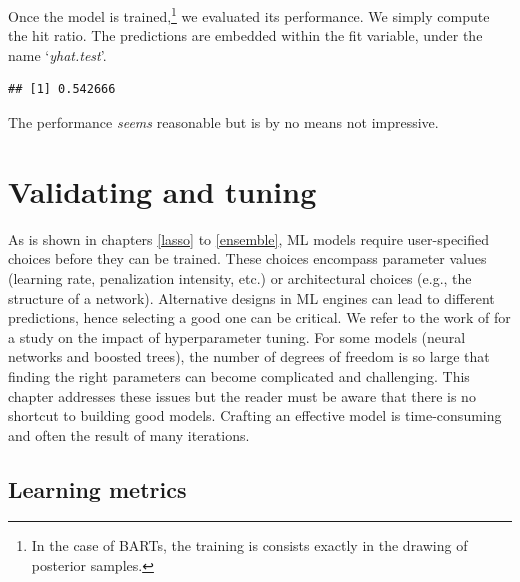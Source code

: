 \documentclass[]{krantz}
\makeatletter
\newenvironment{Shaded}{\begin{snugshade}}{\end{snugshade}}
\newcommand{\DecValTok}[1]{\textcolor[rgb]{0.06,0.06,0.06}{#1}}
\newcommand{\KeywordTok}[1]{\textcolor[rgb]{0.27,0.27,0.27}{\textbf{#1}}}
\newcommand{\NormalTok}[1]{#1}
\newcommand{\OperatorTok}[1]{\textcolor[rgb]{0.43,0.43,0.43}{\textbf{#1}}}
\newcommand{\StringTok}[1]{\textcolor[rgb]{0.5,0.5,0.5}{#1}}
\newenvironment{kframe}{%
\medskip{}
\setlength{\fboxsep}{.8em}
 \def\at@end@of@kframe{}%
 \ifinner\ifhmode%
  \def\at@end@of@kframe{\end{minipage}}%
  \begin{minipage}{\columnwidth}%
 \fi\fi%
 \def\FrameCommand##1{\hskip\@totalleftmargin \hskip-\fboxsep
 \colorbox{shadecolor}{##1}\hskip-\fboxsep
     \hskip-\linewidth \hskip-\@totalleftmargin \hskip\columnwidth}%
 \MakeFramed {\advance\hsize-\width
   \@totalleftmargin\z@ \linewidth\hsize
   \@setminipage}}%
 {\par\unskip\endMakeFramed%
 \at@end@of@kframe}
\renewenvironment{Shaded}{\begin{kframe}}{\end{kframe}}
\let\rmarkdownfootnote\footnote%
\def\footnote{\protect\rmarkdownfootnote}
\theoremstyle{definition}
\theoremstyle{definition}
\theoremstyle{definition}
\theoremstyle{remark}
\makeatother
\begin{document}
\normalsize

Once the model is trained,\footnote{In the case of BARTs, the training
  is consists exactly in the drawing of posterior samples.} we evaluated
its performance. We simply compute the hit ratio. The predictions are
embedded within the fit variable, under the name `\emph{yhat.test}'.

\footnotesize

\begin{Shaded}
\end{Shaded}

\begin{verbatim}
## [1] 0.542666
\end{verbatim}

\normalsize

The performance \emph{seems} reasonable but is by no means not
impressive.

\hypertarget{valtune}{%
\chapter{Validating and tuning}\label{valtune}}

As is shown in chapters \ref{lasso} to \ref{ensemble}, ML models require
user-specified choices before they can be trained. These choices
encompass parameter values (learning rate, penalization intensity, etc.)
or architectural choices (e.g., the structure of a network). Alternative
designs in ML engines can lead to different predictions, hence selecting
a good one can be critical. We refer to the work of
\citet{probst2018tunability} for a study on the impact of hyperparameter
tuning. For some models (neural networks and boosted trees), the number
of degrees of freedom is so large that finding the right parameters can
become complicated and challenging. This chapter addresses these issues
but the reader must be aware that there is no shortcut to building good
models. Crafting an effective model is time-consuming and often the
result of many iterations.

\hypertarget{mlmetrics}{%
\section{Learning metrics}\label{mlmetrics}}
\end{document}
